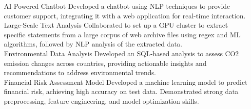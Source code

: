 \documentclass[9pt,a4paper,ragged2e,withhyper]{altacv}
\begin{document}
\begin{paracol}{2}
        \cvevent
            { AI-Powered Chatbot }
            {  }
            {}
            {}
        Developed a chatbot using NLP techniques to provide customer support, integrating it with a web application for real-time interaction.\\
        \vspace{0.5em}
        \cvevent
            { Large-Scale Text Analysis }
            {  }
            {}
            {}
        Collaborated to set up a GPU cluster to extract specific statements from a large corpus of web archive files using regex and ML algorithms, followed by NLP analysis of the extracted data.\\
        \vspace{0.5em}
        \cvevent
            { Environmental Data Analysis }
            {  }
            {}
            {}
        Developed an SQL-based analysis to assess CO2 emission changes across countries, providing actionable insights and recommendations to address environmental trends.\\
        \vspace{0.5em}
        \cvevent
            { Financial Risk Assessment Model }
            {  }
            {}
            {}
        Developed a machine learning model to predict financial risk, achieving high accuracy on test data. Demonstrated strong data preprocessing, feature engineering, and model optimization skills.\\
        \vspace{0.5em}

        
    \end{paracol}
\end{document}
